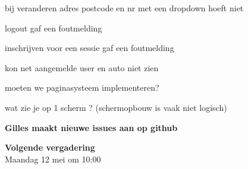 \documentclass[11pt,a4paper,oneside]{article}
\renewenvironment{itemize}[1]{\begin{compactitem}#1}{\end{compactitem}}
\begin{document}
\begin{itemize}
\begin{itemize}
\begin{itemize}
	\item  bij veranderen adres postcode en nr met een dropdown hoeft niet 
	\item  logout gaf een foutmelding

	\item  inschrijven voor een sessie gaf een foutmelding 

	\item  kon net aangemelde user en auto niet zien 

	\item  moeten we paginasysteem implementeren? 

	\item  wat zie je op 1 scherm ? (schermopbouw is vaak niet logisch)
      \end{itemize}
  \end{itemize}
  
\item \textbf{Gilles maakt nieuwe issues aan op github}


\par\item \textbf{Volgende vergadering} \\
Maandag 12 mei om 10:00
\end{itemize}
\end{document}
